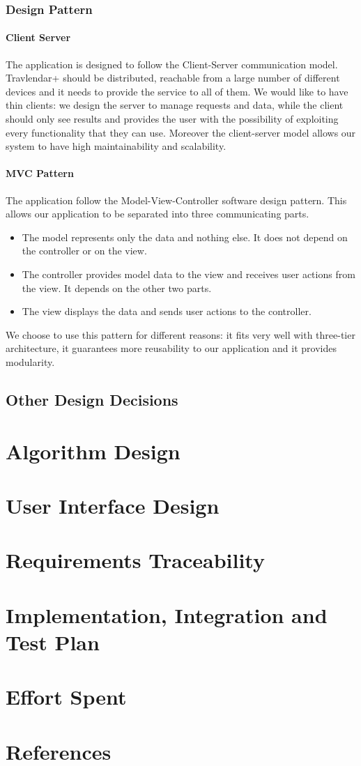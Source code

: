 \documentclass[12pt,titlepage]{article}
\begin{document}
\subsubsection{Design Pattern}
\paragraph{Client Server}
The application is designed to follow the Client-Server communication model. Travlendar+ should be distributed, reachable from a large number of different devices and it needs to provide the service to all of them.
We would like to have thin clients: we design the server to manage requests and data, while the client should only see results and provides the user with the possibility of exploiting every functionality that they can use.
Moreover the client-server model allows our system to have high maintainability and scalability.


\paragraph{MVC Pattern} The application follow the Model-View-Controller software design pattern. This allows our application to be separated into three communicating parts.
\begin{itemize}
\item The model represents only the data and nothing else. It does not depend on the controller or on the view.
\item The controller provides model data to the view and receives user actions from the view. It depends on the other two parts.
\item The view displays the data and sends user actions to the controller.
\end{itemize}
We choose to use this pattern for different reasons: it fits very well with three-tier architecture, it guarantees more reusability to our application and it provides modularity.

\subsection{Other Design Decisions}

\section{Algorithm Design}

\section{User Interface Design}

\section{Requirements Traceability}

\section{Implementation, Integration and Test Plan}

\section{Effort Spent}

\section{References}
\end{document}
